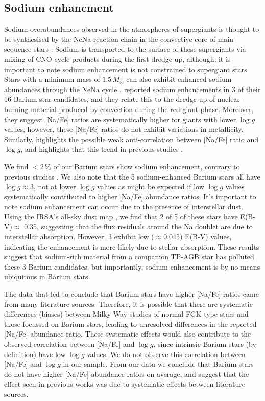 \documentclass[a4paper,fleqn,usenatbib]{mnras}
\begin{document}
\subsection{Sodium enhancment}
Sodium overabundances observed in the atmospheres of supergiants is thought to be synthesised by the NeNa reaction chain in the convective core of main-sequence stars \citep{el1995}. Sodium is transported to the surface of these supergiants via mixing of CNO cycle products during the first dredge-up, although, it is important to note sodium enhancement is not constrained to supergiant stars. Stars with a  minimum mass of $1.5\,M_\odot$ can also exhibit enhanced sodium abundances through the NeNa cycle \citep{denissenkov1987}. \citet{antipova2004} reported sodium enhancements in 3 of their 16 Barium star candidates, and they relate this to the dredge-up of nuclear-burning material produced by convection during the red-giant phase. Moreover, they suggest [Na/Fe] ratios are systematically higher for giants with lower $\log{g}$ values, however, these [Na/Fe] ratios do not exhibit variations in metallicity. Similarly, \citet{decastro2016} highlights the possible weak anti-correlation between [Na/Fe] ratio and $\log{g}$, and highlights that this trend in previous studies \citep[e.g.,][]{boyarchuk2002,mishenina2006,luck2007,takeda2008}.

We find $<2$\,\% of our Barium stars show sodium enhancement, contrary to previous studies \citep[e.g.,][]{decastro2016}. We also note that the 5 sodium-enhanced Barium stars all have $\log{g} \approx 3$, not at lower $\log{g}$ values as might be expected if low $\log{g}$ values systematically contributed to higher [Na/Fe] abundance ratios. It's important to note sodium enhancement can occur due to the presence of interstellar dust. Using the IRSA's all-sky dust map \citep{schlafly2011}, we find that 2 of 5 of these stars have E(B-V)$\approx$ 0.35, suggesting that the flux residuals around the Na doublet are due to interstellar absorption. However, 3 exhibit low ($\approx$0.045) E(B-V) values, indicating the enhancement is more likely due to stellar absorption. These results suggest that sodium-rich material from a companion TP-AGB star has polluted these 3 Barium candidates, but importantly, sodium enhancement is by no means ubiquitous in Barium stars. 

The data that led \citet{decastro2016} to conclude that Barium stars have higher [Na/Fe] ratios came from many literature sources. Therefore, it is possible that there are systematic differences (biases) between Milky Way studies of normal FGK-type stars and those focussed on Barium stars, leading to unresolved differences in the reported [Na/Fe] abundance ratio. These systematic effects would also contribute to the observed correlation between [Na/Fe] and $\log{g}$, since intrinsic Barium stars (by definition) have low $\log{g}$ values. We do not observe this correlation between [Na/Fe] and $\log{g}$ in our sample. From our data we conclude that Barium stars do not have higher [Na/Fe] abundance ratios on average, and suggest that the effect seen in previous works was due to systematic effects between literature sources.
\end{document}
